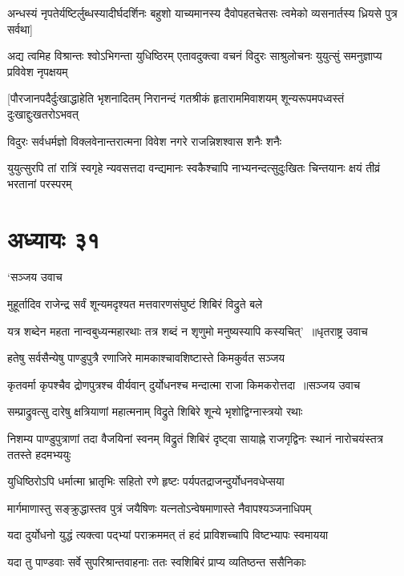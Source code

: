 \threelineshloka
{अन्धस्यं नृपतेर्यष्टिर्लुब्धस्यादीर्घदर्शिनः}
{बहुशो याच्यमानस्य दैवोपहतचेतसः}
{त्वमेको व्यसनार्तस्य ध्रियसे पुत्र सर्वथा]}


\threelineshloka
{अद्य त्वमिह विश्रान्तः श्वोऽभिगन्ता युधिष्ठिरम्}
{एतावदुक्त्वा वचनं विदुरः साश्रुलोचनः}
{युयुत्सुं समनुज्ञाप्य प्रविवेश नृपक्षयम्}


\threelineshloka
{[पौरजानपदैर्दुःखाद्धाहेति भृशनादितम्}
{निरानन्दं गतश्रीकं हृताराममिवाशयम्}
{शून्यरूपमपध्वस्तं दुःखाद्दुःखतरोऽभवत्}


\twolineshloka
{विदुरः सर्वधर्मज्ञो विक्लवेनान्तरात्मना}
{विवेश नगरे राजन्निशश्वास शनैः शनैः}


\threelineshloka
{युयुत्सुरपि तां रात्रिं स्वगृहे न्यवसत्तदा}
{वन्द्यमानः स्वकैश्चापि नाभ्यनन्दत्सुदुःखितः}
{चिन्तयानः क्षयं तीव्रं भरतानां परस्परम्}


\chapter{अध्यायः ३१}
\twolineshloka
{`सञ्जय उवाच}
{}


\twolineshloka
{मुहूर्तादिव राजेन्द्र सर्वं शून्यमदृश्यत}
{मत्तवारणसंघुष्टं शिबिरं विद्रुते बले}


\threelineshloka
{यत्र शब्देन महता नान्वबुध्यन्महारथाः}
{तत्र शब्दं न शृणुमो मनुष्यस्यापि कस्यचित्' ॥धृतराष्ट्र उवाच}
{}


\twolineshloka
{हतेषु सर्वसैन्येषु पाण्डुपुत्रै रणाजिरे}
{मामकाश्चावशिष्टास्ते किमकुर्वत सञ्जय}


\threelineshloka
{कृतवर्मा कृपश्चैव द्रोणपुत्रश्च वीर्यवान्}
{दुर्योधनश्च मन्दात्मा राजा किमकरोत्तदा ॥सञ्जय उवाच}
{}


\twolineshloka
{सम्प्राद्रुवत्सु दारेषु क्षत्रियाणां महात्मनाम्}
{विद्रुते शिबिरे शून्ये भृशोद्विग्नास्त्रयो रथाः}


\threelineshloka
{निशम्य पाण्डुपुत्राणां तदा वैजयिनां स्वनम्}
{विद्रुतं शिबिरं दृष्ट्वा सायाह्ने राजगृद्विनः}
{स्थानं नारोचयंस्तत्र ततस्ते हदमभ्ययुः}


\twolineshloka
{युधिष्ठिरोऽपि धर्मात्मा भ्रातृभिः सहितो रणे}
{हृष्टः पर्यपतद्राजन्दुर्योधनवधेप्सया}


\twolineshloka
{मार्गमाणास्तु सङ्क्रुद्धास्तव पुत्रं जयैषिणः}
{यत्नतोऽन्वेषमाणास्ते नैवापश्यञ्जनाधिपम्}


\twolineshloka
{यदा दुर्योधनो युद्धं त्यक्त्वा पद्भ्यां पराक्रममत्}
{तं हदं प्राविशच्चापि विष्टभ्यापः स्वमायया}


\twolineshloka
{यदा तु पाण्डवाः सर्वे सुपरिश्रान्तवाहनाः}
{ततः स्वशिबिरं प्राप्य व्यतिष्ठन्त ससैनिकाः}


